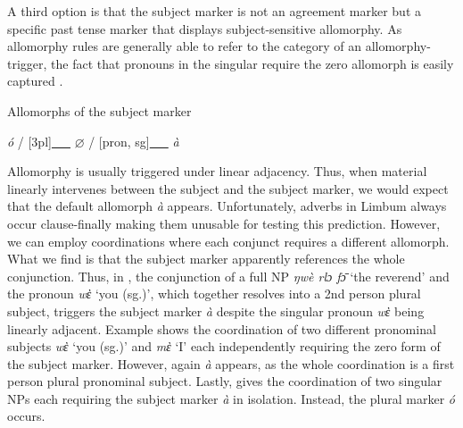 \documentclass[output=paper]{langscibook}
\begin{document}
A third option is that the subject marker is not an agreement marker
but a specific past tense marker that displays subject-sensitive
allomorphy. As allomorphy rules are generally able to refer to the
category of an allomorphy-trigger, the fact that pronouns in the
singular require the zero allomorph is easily captured .

\ea Allomorphs of the subject marker\label{ex:johanneshein:allomorphs}
\begin{xlist}
\ex \textit{ó} / [3pl]\underline{~~~}
\ex $\varnothing$ / [pron, sg]\underline{~~~}
\ex \textit{à}
\end{xlist}
\z
Allomorphy is usually triggered under linear adjacency. Thus, when
material linearly intervenes between the subject and the subject
marker, we would expect that the default allomorph \textit{à}
appears. Unfortunately, adverbs in Limbum always occur clause-finally
making them unusable for testing this prediction. However, we can
employ coordinations where each conjunct requires a different
allomorph. What we find is that the subject marker apparently
references the whole conjunction. Thus, in , the conjunction
of a full NP \textit{ŋwè rlɔ fɔ̄} `the reverend' and the
pronoun \textit{wὲ} `you (sg.)', which together resolves into a 2nd
person plural subject, triggers the subject marker \textit{à}
despite the singular pronoun \textit{wὲ} being linearly adjacent. Example  shows
the coordination of two different pronominal subjects \textit{wὲ}
`you (sg.)' and \textit{mὲ} `I' each independently requiring the
zero form of the subject marker. However, again \textit{à} appears,
as the whole coordination is a first person plural pronominal
subject. Lastly,  gives the coordination of two singular NPs
each requiring the subject marker \textit{à} in isolation. Instead,
the plural marker \textit{ó} occurs.
\end{document}

